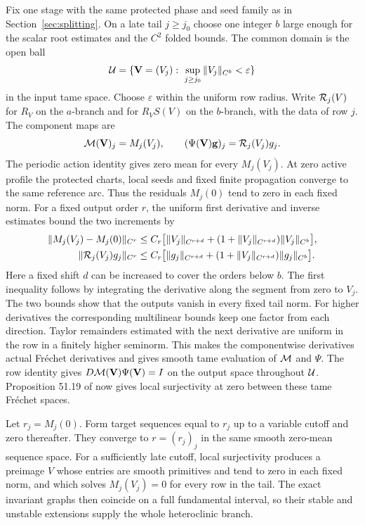 \documentclass[11pt]{article}
\begin{document}
Fix one stage with the same protected phase and seed family as in
Section~\ref{sec:splitting}. On a late tail \(j\ge j_0\) choose one
integer \(b\) large enough for the scalar root estimates and the
\(C^2\) folded bounds. The common domain is the open ball
\[
 {\cal U}=\{\mathbf V=(V_j):\ %
      \sup_{j\ge j_0}\|V_j\|_{C^b}<\varepsilon\}
\]
in the input tame space. Choose \(\varepsilon\) within the uniform row
radius. Write \({\cal R}_j(V)\) for \(R_V\) on the \(a\)-branch and
for \(R_V S(V)\) on the \(b\)-branch, with the data of row \(j\).
The component maps are
\[
 {\cal M}(\mathbf V)_j=M_j(V_j),\qquad
 (\Psi(\mathbf V)\mathbf g)_j={\cal R}_j(V_j)g_j .
\]
The periodic action identity gives zero mean for every \(M_j(V_j)\).
At zero active profile the protected charts, local seeds and fixed
finite propagation converge to the same reference arc. Thus the
residuals \(M_j(0)\) tend to zero in each fixed norm. For a fixed
output order \(r\), the uniform first derivative and inverse
estimates bound the two increments by
\[
\begin{split}
 \|M_j(V_j)-M_j(0)\|_{C^r}
   &\le C_r\big[\|V_j\|_{C^{r+d}}
       +(1+\|V_j\|_{C^{r+d}})\|V_j\|_{C^b}\big],\\
 \|{\cal R}_j(V_j)g_j\|_{C^r}
   &\le C_r\big[\|g_j\|_{C^{r+d}}
       +(1+\|V_j\|_{C^{r+d}})\|g_j\|_{C^b}\big].
\end{split}
\]
Here a fixed shift \(d\) can be increased to cover the orders below
\(b\). The first inequality follows by integrating the derivative
along the segment from zero to \(V_j\). The two bounds show that
the outputs vanish in every fixed tail norm. For higher
derivatives the corresponding multilinear bounds keep one factor
from each direction. Taylor remainders estimated with the next
derivative are uniform in the row in a finitely higher seminorm.
This makes the componentwise derivatives actual Fréchet derivatives
and gives smooth tame evaluation of \({\cal M}\) and \(\Psi\).
The row identity gives \(D{\cal M}(\mathbf V)\Psi(\mathbf V)=I\) on the
output space throughout \({\cal U}\). Proposition 51.19 of \cite{KM}
now gives local surjectivity at zero between these tame Fréchet spaces.

Let \(r_j=M_j(0)\). Form target sequences equal to \(r_j\) up to a variable
cutoff and zero thereafter. They converge to \(r=(r_j)_j\) in the same smooth
zero-mean sequence space. For a sufficiently late cutoff, local surjectivity
produces a preimage \(V\) whose entries are smooth primitives and tend to zero
in each fixed norm, and which solves \(M_j(V_j)=0\) for every row in the tail.
The exact invariant graphs then coincide on a full fundamental interval, so
their stable and unstable extensions supply the whole heteroclinic branch.
\end{document}

